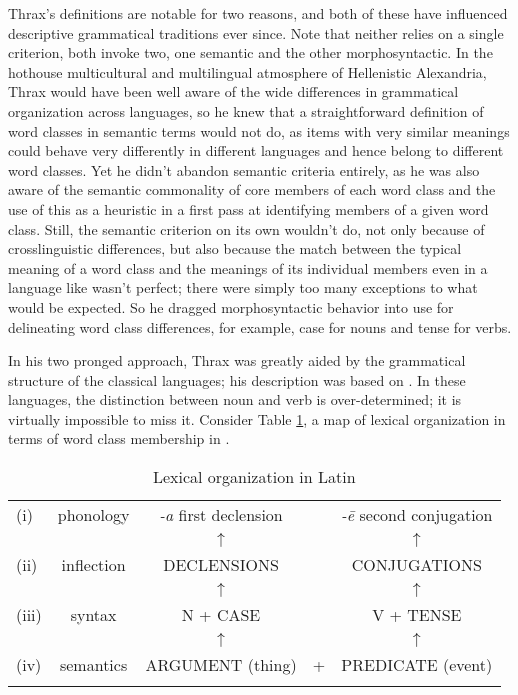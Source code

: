 \documentclass[output=paper]{langsci/langscibook}
\begin{document}
Thrax’s definitions are notable for two reasons, and both of these have influenced descriptive grammatical traditions ever since. Note that neither relies on a single criterion, both invoke two, one semantic and the other morphosyntactic. In the hothouse multicultural and multilingual atmosphere of Hellenistic Alexandria, Thrax would have been well aware of the wide differences in grammatical organization across languages, so he knew that a straightforward definition of word classes in semantic terms would not do, as items with very similar meanings could behave very differently in different languages and hence belong to different word classes. Yet he didn’t abandon semantic criteria entirely, as he was also aware of the semantic commonality of core members of each word class and the use of this as a heuristic in a first pass at identifying members of a given word class. Still, the semantic criterion on its own wouldn’t do, not only because of crosslinguistic differences, but also because the match between the typical meaning of a word class and the meanings of its individual members even in a language like  wasn’t perfect; there were simply too many exceptions to what would be expected. So he dragged morphosyntactic behavior into use for delineating word class differences, for example, case for nouns and tense for verbs.

In his two pronged approach, Thrax was greatly aided by the grammatical structure of the classical languages; his description was based on . In these languages, the distinction between noun and verb is over-determined;  it is virtually impossible to miss it. Consider Table \ref{tab:latin}, a map of lexical organization in terms of word class membership in .

\begin{table}
 \begin{tabular}{lcccc}
 \lsptoprule
(i) & phonology  & \textit{-a} first declension &&	  \textit{-\=e} second conjugation\\
      &           &   $\uparrow$               &&   $\uparrow$ \\                       
(ii)  & inflection &  DECLENSIONS &&  CONJUGATIONS\\
      &           &   $\uparrow$                &&   $\uparrow$ \\                       
(iii) &  syntax  & N + CASE &&  V + TENSE\\
      &           &   $\uparrow$                &&   $\uparrow$ \\                       
(iv)  & semantics  & ARGUMENT (thing) &+& PREDICATE (event)\\
\lspbottomrule
\end{tabular}
 \caption{Lexical organization in Latin}
\label{tab:latin}
\end{table}
\end{document}
